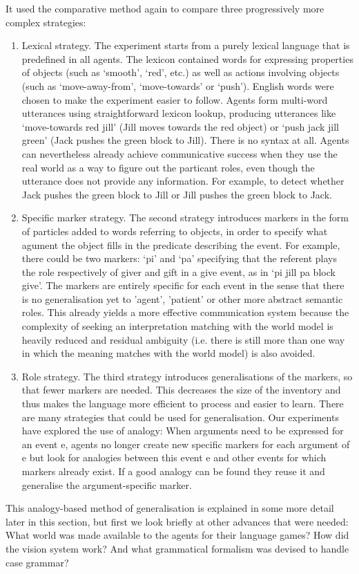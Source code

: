 It used the comparative method again to compare three progressively more complex strategies: 
\begin{enumerate}
\item {\bfshape  Lexical strategy}. The experiment starts from a purely 
lexical language that is predefined in all agents. The lexicon contained words for expressing properties of 
objects (such as `smooth', `red', etc.)
as well as actions involving objects (such as `move-away-from', `move-towards' or `push'). English words
were chosen to make the experiment easier to follow. Agents form
multi-word utterances using straightforward lexicon lookup, producing utterances
like `move-towards red jill' (Jill moves towards the red object) or `push 
jack jill green' (Jack pushes the green block to Jill). There is no syntax at all. Agents can nevertheless already 
achieve communicative success when they use the real world as a way to figure out the particant roles, even though the 
utterance does not provide any information. For example, to detect whether Jack pushes the green block to Jill or Jill 
pushes the green block to Jack. 

\item {\bfshape  Specific marker strategy}. The second strategy introduces markers in the form of particles added to words referring 
to objects, in order to specify what agument the object fills in the predicate describing the 
event. For example, there could be two markers: `pi' 
and `pa' specifying that the referent plays the role respectively of giver and gift in a give event, as in
`pi jill pa block give'. The markers are entirely specific for each event in the sense that there is no generalisation 
yet to 'agent', 'patient' or other more abstract semantic roles. This already yields a more effective 
communication system because the complexity of seeking an interpretation matching with the world model is heavily
reduced and residual ambiguity (i.e. there is still more than one way in which the 
meaning matches with the world model) is also avoided. 

\item {\bfshape  Role strategy}. The third strategy introduces generalisations of the markers, so that 
fewer markers are needed. This decreases the size of the inventory and thus makes the language more efficient to 
process and easier to learn. There are many strategies that could be used for generalisation. Our experiments 
have explored the use of analogy: When arguments 
need to be expressed for an event e, agents no longer create new specific markers for each argument of e
but look for analogies between this event e and other events for which markers already exist. If a good analogy 
can be found they reuse it and generalise the argument-specific marker. 
\end{enumerate}
This analogy-based method of generalisation is explained in some more detail later in this section, but first 
we look briefly at other advances that were needed: What world was made available to the agents for their 
language games? How did the vision system work? And what grammatical formalism was devised to handle case grammar? 


